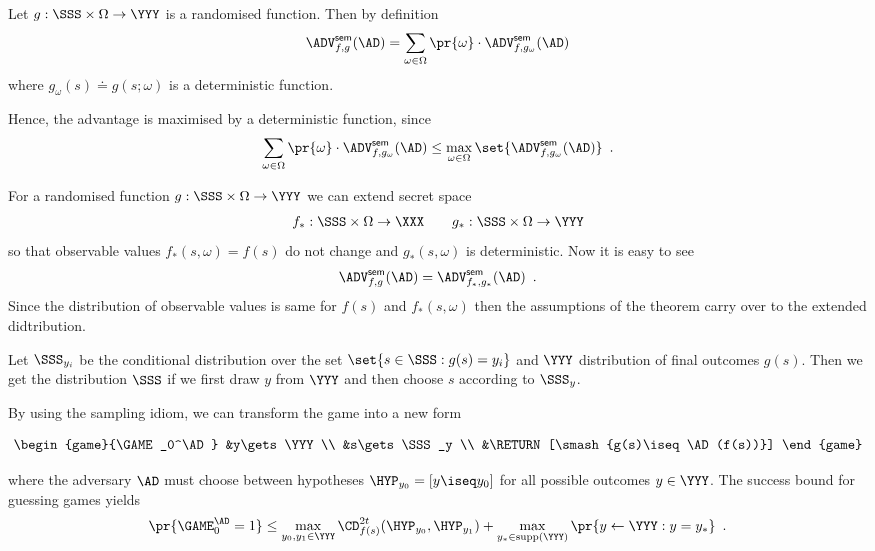 \documentclass[landscape,footrule]{foils}
\newcommand{\lastline}{\vspace*{-2ex}}
\begin{document}
\lastline



Let $g:\SSS\times\Omega\to\YYY$ is a randomised function. Then by definition
\begin{align*}
  \advSemXX{f,g}{\AD}=\sum_{\omega\in\Omega}\pr{\omega}\cdot \advSemXX{f,g_\omega}{\AD}
\end{align*}
where $g_\omega(s)\doteq g(s;\omega)$ is a deterministic function. 
\Bigskip

Hence, the advantage is maximised by a deterministic function, since 
\begin{align*}
  \sum_{\omega\in\Omega}\pr{\omega}\cdot \advSemXX{f,g_\omega}{\AD}%
  \leq%
  \max_{\omega\in\Omega}\set{\smash{\advSemXX{f,g_\omega}{\AD}}}\enspace.
\end{align*}



For a randomised function $g:\SSS\times\Omega\to\YYY$ we can extend secret space
\begin{align*}
f_*: \SSS\times \Omega\to \XXX\qquad
g_*: \SSS\times \Omega\to \YYY  
\end{align*}
so that observable values $f_*(s,\omega)=f(s)$ do not change and $g_*(s,\omega)$ is deterministic.
Now it is easy to see
\begin{align*}
  \advSemXX{f,g}{\AD}=\advSemXX{f_*,g_*}{\AD}\enspace.
\end{align*}
Since the distribution of observable values is same for $f(s)$ and $f_*(s,\omega)$ then the assumptions of the theorem carry over to the extended didtribution.






Let $\SSS_{y_i}$ be the conditional distribution over the set
$\set{s\in\SSS:g(s)=y_i}$ and $\YYY$ distribution of final outcomes
$g(s)$. Then we get the distribution $\SSS$ if we first draw $y$ from
$\YYY$ and then choose $s$ according to $\SSS_{y}$.\lastline


By using the sampling idiom, we can transform the game into a new form  
\begin{small}
\begin{align*}
  \begin{game}{\GAME_0^\AD}
    &y\gets\YYY\\
    &s\gets\SSS_y \\ 
    &\RETURN [\smash{g(s)\iseq \AD(f(s))}]
  \end{game}
\end{align*}%
\end{small}%
where the adversary $\AD$ must choose between hypotheses
$\HYP_{y_0}=[y\iseq y_0]$ for all possible outcomes $y\in\YYY$. The
success bound for guessing games  yields 
\begin{align*}
  \pr{\GAME_0^{\AD}=1}%
  \leq \max_{y_0,y_1\in \YYY} \CD_{f(s)}^{2t}(\HYP_{y_0},\HYP_{y_1})
  +\max_{y_*\in\supp(\YYY)}\pr{y\gets\YYY:y=y_*}\enspace.
\end{align*}
\end{document}
